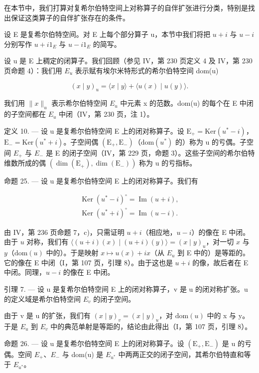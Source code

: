 在本节中，我们打算对复希尔伯特空间上对称算子的自伴扩张进行分类，特别是找出保证这类算子的自伴扩张存在的条件。

设 E 是复希尔伯特空间。对 E 上每个部分算子 u，本节中我们将把 \(u + i\) 与 \(u - i\) 分别写作 \(u + i1_{E}\) 与 \(u - i1_{E}\) 的简写。

设 u 是 E 上稠定的闭算子。我们回顾（参见 IV，第 230 页定义 4 及 IV，第 230 页命题 4）：我们用 \(E_{u}\) 表示赋有埃尔米特形式的希尔伯特空间 dom(u)

\[
(x \mid y) _ {u} = \langle x \mid y \rangle + \langle u (x) \mid u (y) \rangle .
\]

我们用 \(\|x\|_{u}\) 表示希尔伯特空间 \(E_{u}\) 中元素 x 的范数。dom(u) 的每个在 E 中闭的子空间都在 \(E_{u}\) 中闭（IV，第 230 页，注 1）。

定义 10. --- 设 u 是复希尔伯特空间 E 上的闭对称算子。设 \(\mathrm{E}_{+} = \mathrm{Ker}(u^{*} - i)\)，\(\mathrm{E}_{-} = \mathrm{Ker}(u^{*} + i)\)。子空间偶 \((\mathrm{E}_{+}, \mathrm{E}_{-})\)（\(\mathrm{dom}(u^{*})\) 的）称为 u 的亏偶。子空间 \(E_{+}\) 与 \(E_{-}\) 是 E 的闭子空间（IV，第 229 页，命题 3）。这些子空间的希尔伯特维数所成的偶 \((\dim(\mathrm{E}_{+}), \dim(\mathrm{E}_{-}))\) 称为 u 的亏指标。

命题 25. --- 设 u 是复希尔伯特空间 E 上的闭对称算子。我们有

\[
\begin{array}{l} \operatorname{Ker} (u ^ {*} - i) ^ {\circ} = \operatorname{Im} (u + i), \\ \operatorname{Ker} (u ^ {*} + i) ^ {\circ} = \operatorname{Im} (u - i). \end{array}
\]

由 IV，第 236 页命题 7，c)，只需证明 \(u + i\)（相应地，\(u - i\)）的像在 E 中闭。由于 \(u\) 对称，我们有 \(\langle (u + i)(x) \mid (u + i)(y) \rangle = (x \mid y)_u\)，对一切 \(x\) 与 \(y\)（\(\text{dom}(u)\) 中的）。于是映射 \(x \mapsto u(x) + ix\)（从 \(E_u\) 到 E 中的）是等距的。它的像在 E 中闭（I，第 107 页，引理 8）。由于这也是 \(u + i\) 的像，故后者在 E 中闭。同理，\(u - i\) 的像在 E 中闭。

引理 7. --- 设 u 是复希尔伯特空间 E 上的闭对称算子，v 是 u 的闭对称扩张。u 的定义域是希尔伯特空间 \(E_{v}\) 的闭子空间。

由于 v 是 u 的扩张，我们有 \((x \mid y)_{v} = (x \mid y)_{u}\)，对 \(\text{dom}(u)\) 中的 x 与 y。于是 \(E_{u}\) 到 \(E_{v}\) 中的典范单射是等距的，结论由此得出（I，第 107 页，引理 8）。

命题 26. --- 设 u 是复希尔伯特空间 E 上的闭对称算子。设 \((\mathrm{E}_{+}, \mathrm{E}_{-})\) 是 u 的亏偶。空间 \(E_{+}\)、\(E_{-}\) 与 dom(u) 是 \(E_{u^{*}}\) 中两两正交的闭子空间，其希尔伯特直和等于 \(E_{u^{*}}\)。

